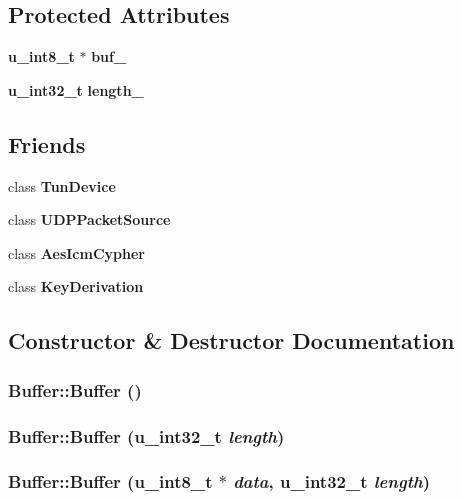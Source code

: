 \subsection*{Protected Attributes}
\begin{CompactItemize}
\item 
{\bf u\_\-int8\_\-t} $\ast$ {\bf buf\_\-}
\item 
{\bf u\_\-int32\_\-t} {\bf length\_\-}
\end{CompactItemize}
\subsection*{Friends}
\begin{CompactItemize}
\item 
class {\bf Tun\-Device}
\item 
class {\bf UDPPacket\-Source}
\item 
class {\bf Aes\-Icm\-Cypher}
\item 
class {\bf Key\-Derivation}
\end{CompactItemize}


\subsection{Constructor \& Destructor Documentation}
\subsubsection{\setlength{\rightskip}{0pt plus 5cm}Buffer::Buffer ()}\label{classBuffer_e7ef2cd201190fde551dcb902627112b}


\subsubsection{\setlength{\rightskip}{0pt plus 5cm}Buffer::Buffer ({\bf u\_\-int32\_\-t} {\em length})}\label{classBuffer_5c58aa9e491f709011408ee7837d57d0}


\subsubsection{\setlength{\rightskip}{0pt plus 5cm}Buffer::Buffer ({\bf u\_\-int8\_\-t} $\ast$ {\em data}, {\bf u\_\-int32\_\-t} {\em length})}\label{classBuffer_5bc2edccfb7c1a33354c895ab25c4816}


